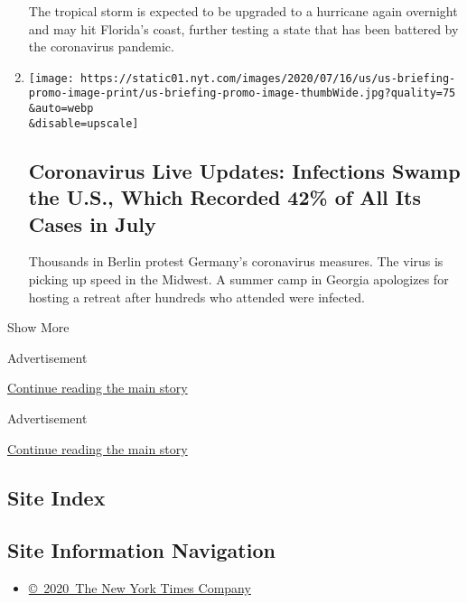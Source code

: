 \begin{enumerate}
  The tropical storm is expected to be upgraded to a hurricane again
  overnight and may hit Florida's coast, further testing a state that
  has been battered by the coronavirus pandemic.
\item
  \href{/2020/08/01/world/coronavirus-covid-19.html}{}

  \texttt{[image: https://static01.nyt.com/images/2020/07/16/us/us-briefing-promo-image-print/us-briefing-promo-image-thumbWide.jpg?quality=75\\\&auto=webp\\\&disable=upscale]}

  \hypertarget{coronavirus-live-updates-infections-swamp-the-us-which-recorded-42-of-all-its-cases-in-july}{%
  \subsection{Coronavirus Live Updates: Infections Swamp the U.S., Which
  Recorded 42\% of All Its Cases in
  July}\label{coronavirus-live-updates-infections-swamp-the-us-which-recorded-42-of-all-its-cases-in-july}}

  Thousands in Berlin protest Germany's coronavirus measures. The virus
  is picking up speed in the Midwest. A summer camp in Georgia
  apologizes for hosting a retreat after hundreds who attended were
  infected.
\end{enumerate}

Show More

Advertisement

\protect\hyperlink{after-mid1}{Continue reading the main story}

Advertisement

\protect\hyperlink{after-mktg}{Continue reading the main story}

\hypertarget{site-index}{%
\subsection{Site Index}\label{site-index}}

\hypertarget{site-information-navigation}{%
\subsection{Site Information
Navigation}\label{site-information-navigation}}

\begin{itemize}
\tightlist
\item
  \href{https://help.nytimes.com/hc/en-us/articles/115014792127-Copyright-notice}{©~2020~The
  New York Times Company}
\end{itemize}

